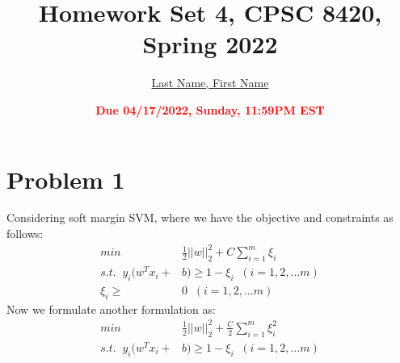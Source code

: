 \documentclass[11pt]{article}
\title{{\bf Homework Set 4, CPSC 8420, Spring 2022}} %
\author{\Large\underline{Last Name, First Name}}
\date{\textbf{\Large\textcolor{red}{Due 04/17/2022, Sunday, 11:59PM EST}}} %
\begin{document}
\maketitle

\section*{Problem 1}
Considering soft margin SVM, where we have the objective and constraints as follows:
\begin{equation}\label{eq:1}
	\begin{aligned}
		min\;\; &\frac{1}{2}||w||_2^2 +C\sum\limits_{i=1}^{m}\xi_i\\s.t.  \;\; y_i(w^Tx_i + &b)  \geq 1 - \xi_i \;\;(i =1,2,...m)\\\xi_i \geq &0 \;\;(i =1,2,...m)
	\end{aligned}
\end{equation}
Now we formulate another formulation as:
\begin{equation}
	\begin{aligned}
		min\;\; &\frac{1}{2}||w||_2^2 +\frac{C}{2}\sum\limits_{i=1}^{m}\xi_i^2\\s.t.  \;\; y_i(w^Tx_i + &b)  \geq 1 - \xi_i \;\;(i =1,2,...m)
	\end{aligned}
\end{equation}
\end{document}
